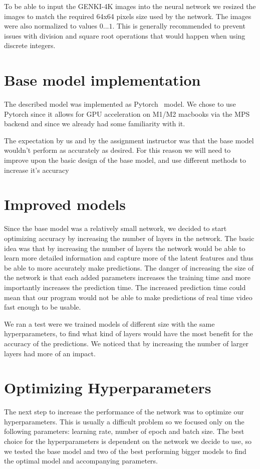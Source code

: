 \documentclass[12pt,a4paper,english
]{tunithesis}
\begin{document}
To be able to input the GENKI-4K images into the neural network we resized the images to match the required 64x64 pixels size used by the network. The images were also normalized to values $0...1$. This is generally recommended to prevent issues with division and square root operations that would happen when using discrete integers.


\section{Base model implementation}
The described model was implemented as Pytorch~\cite{pytorch} model. We chose to use Pytorch since it allows for GPU acceleration on M1/M2 macbooks via the MPS backend and since we already had some familiarity with it.

The expectation by us and by the assignment instructor was that the base model wouldn't perform as accurately as desired. For this reason we will need to improve upon the basic design of the base model, and use different methods to increase it's accuracy

\section{Improved models}
Since the base model was a relatively small network, we decided to start optimizing accuracy by increasing the number of layers in the network. The basic idea was that by increasing the number of layers the network would be able to learn more detailed information and capture more of the latent features and thus be able to more accurately make predictions. The danger of increasing the size of the network is that each added parameters increases the training time and more importantly increases the prediction time. The increased prediction time could mean that our program would not be able to make predictions of real time video fast enough to be usable.

We ran a test were we trained models of different size with the same hyperparameters, to find what kind of layers would have the most benefit for the accuracy of the predictions. We noticed that by increasing the number of larger layers had more of an impact.

\section{Optimizing Hyperparameters}
The next step to increase the performance of the network was to optimize our hyperparameters. This is usually a difficult problem so we focused only on the following parameters: learning rate, number of epoch and batch size. The best choice for the hyperparameters is dependent on the network we decide to use, so we tested the base model and two of the best performing bigger models to find the optimal model and accompanying parameters.
\end{document}
